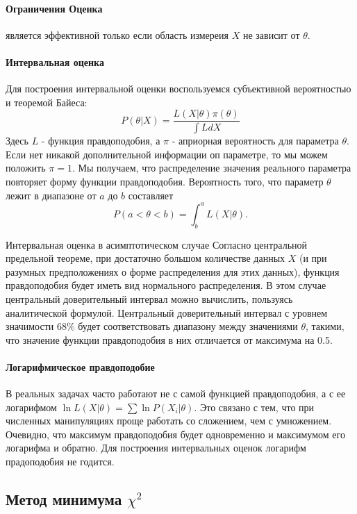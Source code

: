 \paragraph{Ограничения Оценка}
является эффективной только если область измереия $X$ не зависит от
$\theta$.

\paragraph{Интервальная оценка} Для построения интервальной
оценки воспользуемся субъективной вероятностью и теоремой Байеса:
\begin{equation}
  P(\theta | X) = \frac{L(X|\theta) \pi(\theta)}{\int{LdX}}
\end{equation} Здесь $L$ - функция правдоподобия, а $\pi$ -
априорная вероятность для параметра $\theta$. Если нет никакой
дополнительной информации оп параметре, то мы можем положить
$\pi = 1$. Мы получаем, что распределение значения реального параметра
повторяет форму функции правдоподобия. Вероятность того, что параметр
$\theta$ лежит в диапазоне от $a$ до $b$ составляет
\begin{equation}
  P(a < \theta < b) = \int_b^a{L(X | \theta)}.
\end{equation}

Интервальная оценка в асимптотическом случае
Согласно центральной предельной теореме, при достаточно большом
количестве данных $X$ (и при разумных предположениях о форме
распределения для этих данных), функция правдоподобия будет иметь вид
нормального распределения. В этом случае центральный доверительный
интервал можно вычислить, пользуясь аналитической формулой. Центральный
доверительный интервал с уровнем значимости 68\% будет соответствовать
диапазону между значениями $\theta$, такими, что значение функции
правдоподобия в них отличается от максимума на 0.5.

\paragraph{Логарифмическое правдоподобие}
В реальных задачах часто работают не с
самой функцией правдоподобия, а с ее логарифмом
$\ln L(X|\theta) = \sum{\ln P(X_i | \theta)}$. Это связано с тем, что
при численных манипуляциях проще работать со сложением, чем с
умножением. Очевидно, что максимум правдоподобия будет одновременно и
максимумом его логарифма и обратно. Для построения интервальных оценок
логарифм прадоподобия не годится.


\subsection{Метод минимума \texorpdfstring{$\chi^{2}$}{chi2}}
\label{sec:chi2}

